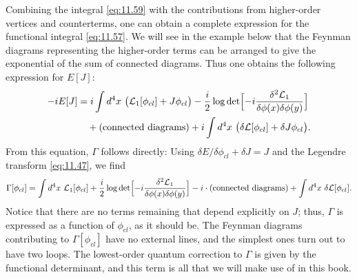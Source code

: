 Combining the integral \eqref{eq:11.59} with the contributions from
higher-order vertices and counterterms, one can obtain a complete expression
for the functional integral \eqref{eq:11.57}.  We will see in the example
below that the Feynman diagrams representing the higher-order terms can be
arranged to give the exponential of the sum of connected diagrams.  Thus one
obtains the following expression for $E[J]$:
\begin{equation}
  \begin{aligned}
    -iE[J] &= i\int d^4x\ \bigl( \mathcal{L}_1[\phi_{cl}] + J\phi_{cl} \bigr)
      - \frac{i}{2}\log\det\Bigl[ -i\frac{\delta^2\mathcal{L}_1}
        {\delta\phi(x)\delta\phi(y)} \Bigr]\\
    &\quad + (\text{connected diagrams}) + i\int d^4x\ \bigl(
      \delta\mathcal{L}[\phi_{cl}] + \delta J\phi_{cl} \bigr) .
  \end{aligned}
  \label{eq:11.62}
\end{equation}
From this equation, $\Gamma$ follows directly: Using $\delta E/\delta\phi_{cl}
+ \delta J = J$ and the Legendre transform \eqref{eq:11.47}, we find
\begin{equation}
  \Gamma[\phi_{cl}] = \int d^4x\ \mathcal{L}_1[\phi_{cl}]
    + \frac{i}{2}\log\det\Bigl[ -i\frac{\delta^2\mathcal{L}_1}
      {\delta\phi(x)\delta\phi(y)} \Bigr]
    - i\cdot(\text{connected diagrams}) + \int d^4x\ \delta\mathcal{L}[\phi_{cl}].
  \label{eq:11.63}
\end{equation}
Notice that there are no terms remaining that depend explicitly on $J$; thus,
$\Gamma$ is expressed as a function of $\phi_{cl}$, as it should be.  The
Feynman diagrams contributing to $\Gamma[\phi_{cl}]$ have no external lines,
and the simplest ones turn out to have two loops.  The lowest-order quantum
correction to $\Gamma$ is given by the functional determinant, and this term
is all that we will make use of in this book.

